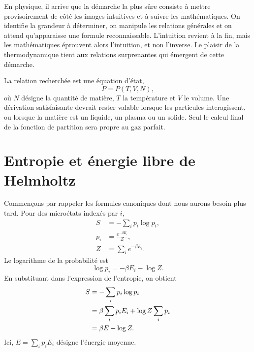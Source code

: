 En physique, il arrive que la démarche la plus sûre consiste à mettre provisoirement de côté les images intuitives et à suivre les mathématiques. On identifie la grandeur à déterminer, on manipule les relations générales et on attend qu’apparaisse une formule reconnaissable. L’intuition revient à la fin, mais les mathématiques éprouvent alors l’intuition, et non l’inverse. Le plaisir de la thermodynamique tient aux relations surprenantes qui émergent de cette démarche.

La relation recherchée est une équation d’état, \begin{equation}
 P=P(T,V,N),
 \label{eq:sm5-equation-of-state-target}
\end{equation} où \(N\) désigne la quantité de matière, \(T\) la température et \(V\) le volume. Une dérivation satisfaisante devrait rester valable lorsque les particules interagissent, ou lorsque la matière est un liquide, un plasma ou un solide. Seul le calcul final de la fonction de partition sera propre au gaz parfait.

\section{Entropie et énergie libre de Helmholtz}

Commençons par rappeler les formules canoniques dont nous aurons besoin plus tard. Pour des microétats indexés par \(i\), \begin{equation}
 \begin{aligned}
 S&=-\sum_i p_i\log p_i,\\
 p_i&=\frac{e^{-\beta E_i}}{Z},\\
 Z&=\sum_i e^{-\beta E_i}.
 \end{aligned}
 \label{eq:sm5-canonical-definitions}
\end{equation} Le logarithme de la probabilité est \begin{equation}
 \log p_i=-\beta E_i-\log Z.
 \label{eq:sm5-log-probability}
\end{equation} En substituant dans l’expression de l’entropie, on obtient \begin{align}
 S
 &=-\sum_i p_i\log p_i \notag\\
 &=\beta\sum_i p_iE_i+\log Z\sum_i p_i \notag\\
 &=\beta E+\log Z.
 \label{eq:sm5-entropy-log-z}
\end{align} Ici, \(E=\sum_i p_iE_i\) désigne l’énergie moyenne.

\begin{classroomqa}\end{classroomqa}

